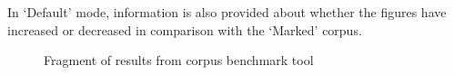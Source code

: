 In `Default' mode, information is also provided about whether the figures have
increased or decreased in comparison with the `Marked' corpus.

\begin{figure}[htbp]
\begin{center}
\end{center}
\caption{Fragment of results from corpus benchmark tool}
\label{fig:benchmark}
\end{figure}

%



%
%
%
%
%
%

